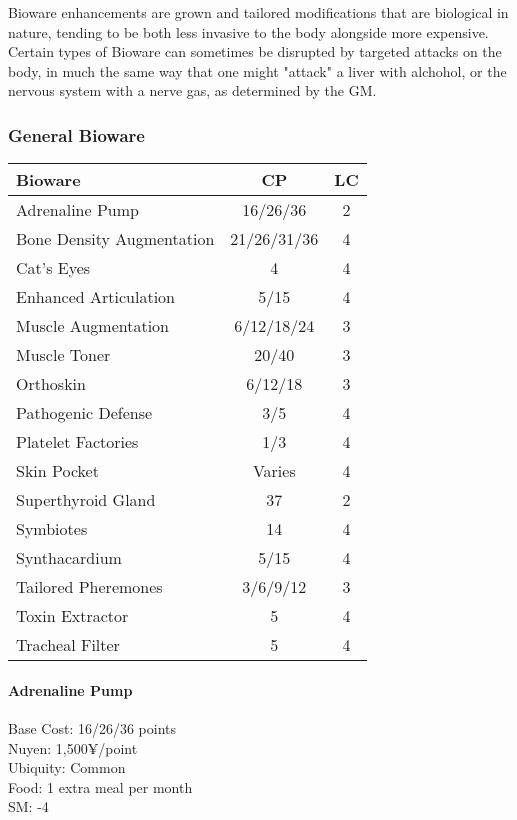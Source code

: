 \begin{multicols*}{3}
	Bioware enhancements are grown and tailored modifications that are biological in nature, tending to be both less invasive to the body alongside more expensive. Certain types of Bioware can sometimes be disrupted by targeted attacks on the body, in much the same way that one might "attack" a liver with alchohol, or the nervous system with a nerve gas, as determined by the GM.
	
	\subsubsection{General Bioware}
	
	\begin{center}
		\begin{adjustwidth}{-3mm}{}
		\begin{tabularx}{0.35\textwidth}{|X|c|c|}
			\hline
			Bioware & CP & LC\\
			\hline
			\hline
			Adrenaline Pump & 16/26/36 & 2 \\
			Bone Density Augmentation & 21/26/31/36 & 4 \\
			Cat's Eyes & 4 & 4 \\
			Enhanced Articulation & 5/15 & 4 \\
			Muscle Augmentation & 6/12/18/24 & 3 \\
			Muscle Toner & 20/40 & 3 \\
			Orthoskin & 6/12/18 & 3 \\
			Pathogenic Defense & 3/5 & 4 \\
			Platelet Factories & 1/3 & 4 \\
			Skin Pocket & Varies & 4 \\
			Superthyroid Gland & 37 & 2 \\
			Symbiotes & 14 & 4 \\
			Synthacardium & 5/15 & 4 \\
			Tailored Pheremones & 3/6/9/12 & 3 \\
			Toxin Extractor & 5 & 4 \\
			Tracheal Filter & 5 & 4 \\
			\hline
		\end{tabularx}
		\end{adjustwidth}
	\end{center}
	
	\paragraph{Adrenaline Pump}
	\begin{flushright}
		Base Cost: 16/26/36 points\\
		Nuyen: 1,500¥/point\\
		Ubiquity: Common\\
		Food: 1 extra meal per month\\
		SM: -4\\
	\end{flushright}
	

\end{multicols*}
